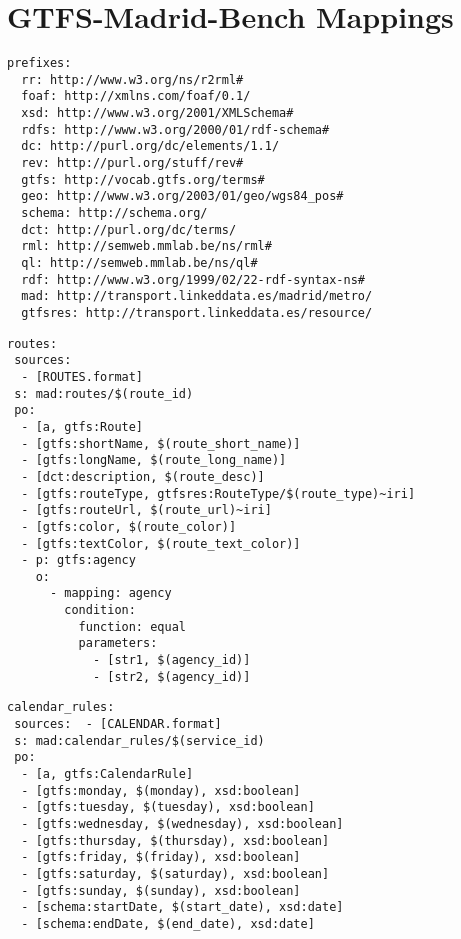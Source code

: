 \chapter{GTFS-Madrid-Bench Mappings}
\label{sec:appendix2}


\begin{lstlisting}[caption=Prefixes, label=lst:prefixes2, basicstyle=\ttfamily,frame=single]
prefixes:
  rr: http://www.w3.org/ns/r2rml#
  foaf: http://xmlns.com/foaf/0.1/
  xsd: http://www.w3.org/2001/XMLSchema#
  rdfs: http://www.w3.org/2000/01/rdf-schema#
  dc: http://purl.org/dc/elements/1.1/
  rev: http://purl.org/stuff/rev#
  gtfs: http://vocab.gtfs.org/terms#
  geo: http://www.w3.org/2003/01/geo/wgs84_pos#
  schema: http://schema.org/
  dct: http://purl.org/dc/terms/
  rml: http://semweb.mmlab.be/ns/rml#
  ql: http://semweb.mmlab.be/ns/ql#
  rdf: http://www.w3.org/1999/02/22-rdf-syntax-ns#
  mad: http://transport.linkeddata.es/madrid/metro/
  gtfsres: http://transport.linkeddata.es/resource/

\end{lstlisting}
\begin{lstlisting}[caption=Routes TripleMap, label=lst:routes, basicstyle=\ttfamily,frame=single]
routes:
 sources:
  - [ROUTES.format]
 s: mad:routes/$(route_id)
 po:
  - [a, gtfs:Route]
  - [gtfs:shortName, $(route_short_name)]
  - [gtfs:longName, $(route_long_name)]
  - [dct:description, $(route_desc)]
  - [gtfs:routeType, gtfsres:RouteType/$(route_type)~iri]
  - [gtfs:routeUrl, $(route_url)~iri]
  - [gtfs:color, $(route_color)]
  - [gtfs:textColor, $(route_text_color)]
  - p: gtfs:agency
    o:
      - mapping: agency
        condition:
          function: equal
          parameters:
            - [str1, $(agency_id)]
            - [str2, $(agency_id)]
\end{lstlisting}
\begin{lstlisting}[caption=Calendar\_Date TripleMap, label=lst:calendarDate, basicstyle=\ttfamily,frame=single]
calendar_rules:
 sources:  - [CALENDAR.format]
 s: mad:calendar_rules/$(service_id)
 po:
  - [a, gtfs:CalendarRule]
  - [gtfs:monday, $(monday), xsd:boolean]
  - [gtfs:tuesday, $(tuesday), xsd:boolean]
  - [gtfs:wednesday, $(wednesday), xsd:boolean]
  - [gtfs:thursday, $(thursday), xsd:boolean]
  - [gtfs:friday, $(friday), xsd:boolean]
  - [gtfs:saturday, $(saturday), xsd:boolean]
  - [gtfs:sunday, $(sunday), xsd:boolean]
  - [schema:startDate, $(start_date), xsd:date]
  - [schema:endDate, $(end_date), xsd:date]
\end{lstlisting}

